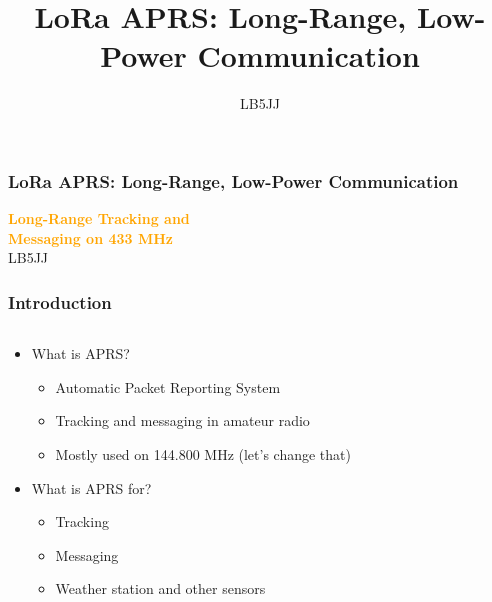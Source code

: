 \documentclass[aspectratio=169]{beamer}
\title[LoRa APRS: Long-Range, Low-Power Communication]{LoRa APRS: Long-Range, Low-Power Communication}
\author{LB5JJ}
\begin{document}
\begin{frame}
  \frametitle{LoRa APRS: Long-Range, Low-Power Communication}
  \begin{center}
    {\Huge \textbf{\textcolor{orange}{Long-Range Tracking and\\Messaging on 433 MHz}}} \\[1cm]
    {\Large \textcolor{light}{LB5JJ}}
  \end{center}
\end{frame}

\begin{frame}[t]
  \frametitle{Introduction}
  \begin{columns}
    \begin{column}{0.66\textwidth}
      \begin{itemize}
        \item What is APRS?
        \medskip
        \begin{itemize}
          \item Automatic Packet Reporting System
          \medskip
          \item Tracking and messaging in amateur radio
          \medskip
          \item Mostly used on 144.800 MHz (let's change that)
        \end{itemize}
        \medskip
        \item What is APRS for?
        \medskip
        \begin{itemize}
          \item Tracking
          \medskip
          \item Messaging
          \medskip
          \item Weather station and other sensors
        \end{itemize}
      \end{itemize}
    \end{column}
    \begin{column}{0.33\textwidth}
    \end{column}
  \end{columns}
\end{frame}
\end{document}
